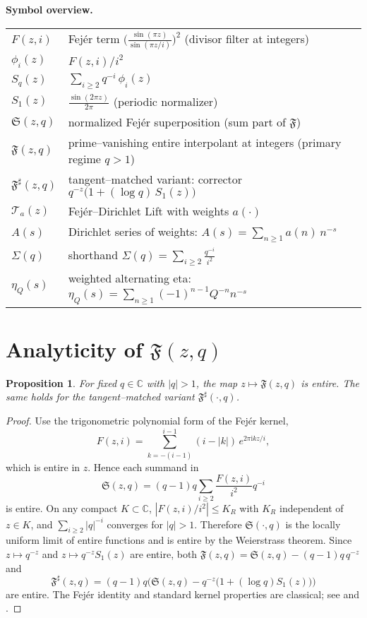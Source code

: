 \documentclass[11pt,a4paper]{amsart}
\newcommand{\C}{\mathbb{C}}
\newcommand{\ii}{\mathrm{i}}
\newcommand{\Fbase}{\mathfrak F}
\newcommand{\Fsharp}{\Fbase^{\sharp}}
\theoremstyle{plain}
\newtheorem{proposition}[theorem]{Proposition}
\theoremstyle{definition}
\theoremstyle{remark}
\begin{document}
\medskip
\noindent\textbf{Symbol overview.}\label{app:symbols}
\begin{center}
\begin{tabular}{@{}ll@{}}
$F(z,i)$ & Fej\'er term $\displaystyle \Big(\frac{\sin(\pi z)}{\sin(\pi z/i)}\Big)^{\!2}$ (divisor filter at integers) \\
$\phi_i(z)$ & $\displaystyle F(z,i)/i^2$ \\
$S_q(z)$ & $\displaystyle \sum_{i\ge2} q^{-i}\,\phi_i(z)$ \\
$S_1(z)$ & $\displaystyle \frac{\sin(2\pi z)}{2\pi}$ (periodic normalizer) \\
$\mathfrak S(z,q)$ & normalized Fej\'er superposition (sum part of $\mathfrak F$) \\
$\mathfrak F(z,q)$ & prime–vanishing entire interpolant at integers (primary regime $q>1$) \\
$\Fsharp(z,q)$ & tangent–matched variant: corrector $q^{-z}\bigl(1+(\log q)\,S_1(z)\bigr)$ \\
$\mathcal{T}_a(z)$ & Fej\'er–Dirichlet Lift with weights $a(\cdot)$ \\
$A(s)$ & Dirichlet series of weights: $\displaystyle A(s)=\sum_{n\ge1} a(n)\,n^{-s}$ \\
$\Sigma(q)$ & shorthand $\displaystyle \Sigma(q)=\sum_{i\ge2}\frac{q^{-i}}{i^2}$ \\
$\eta_Q(s)$ & weighted alternating eta: $\displaystyle \eta_Q(s)=\sum_{n\ge1}(-1)^{n-1}Q^{-n}n^{-s}$ \\
\end{tabular}
\end{center}

\section{Analyticity of $\mathfrak F(z,q)$}\label{app:analyticity}

\begin{proposition}
For fixed $q\in\C$ with $|q|>1$, the map $z\mapsto\mathfrak F(z,q)$ is entire. The same holds for the tangent–matched variant $\Fsharp(\cdot,q)$.
\end{proposition}

\begin{proof}
Use the trigonometric polynomial form of the Fejér kernel,
\[
F(z,i)=\sum_{k=-(i-1)}^{i-1}(i-|k|)\,e^{2\pi\ii k z/i},
\]
which is entire in $z$. Hence each summand in
\[
\mathfrak S(z,q)=(q-1)q\sum_{i\ge2}\frac{F(z,i)}{i^2}q^{-i}
\]
is entire. On any compact $K\subset\C$, $|F(z,i)/i^2|\le K_R$ with $K_R$ independent of $z\in K$, and $\sum_{i\ge2}|q|^{-i}$ converges for $|q|>1$. Therefore $\mathfrak S(\cdot,q)$ is the locally uniform limit of entire functions and is entire by the Weierstrass theorem. Since $z\mapsto q^{-z}$ and $z\mapsto q^{-z}S_1(z)$ are entire, both $\mathfrak F(z,q)=\mathfrak S(z,q)-(q-1)q\,q^{-z}$ and
\[
\Fsharp(z,q)=(q-1)q\Big(\mathfrak S(z,q)-q^{-z}\bigl(1+(\log q)S_1(z)\bigr)\Big)
\]
are entire. The Fejér identity and standard kernel properties are classical; see \cite[Ch.~I]{katznelson2004} and \cite{zygmund2002}.
\end{proof}
\end{document}
